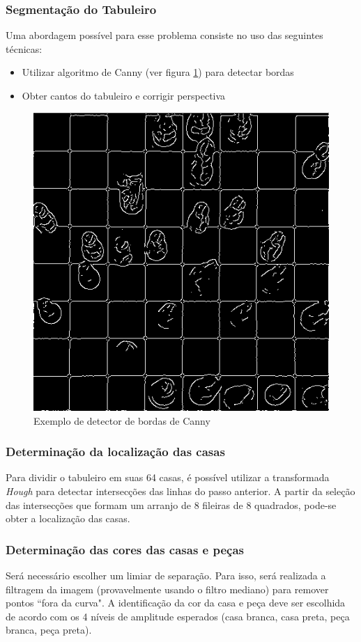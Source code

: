 \documentclass[a4paper,12pt,twoside]{article}
\begin{document}
\subsubsection{Segmentação do Tabuleiro}
Uma abordagem possível para esse problema consiste no uso das seguintes técnicas:
\begin{itemize}
    \item{Utilizar algoritmo de Canny (ver figura \ref{fig:detector}) para detectar bordas}
    \item{Obter cantos do tabuleiro e corrigir perspectiva}
\end{itemize}

\begin{figure}[h!]
\centering
  \includegraphics[width=0.6\linewidth]{fig/detector.png}
\caption{Exemplo de detector de bordas de Canny}
\label{fig:detector}
\end{figure}

\subsubsection{Determinação da localização das casas}
Para dividir o tabuleiro em suas 64 casas,
é possível utilizar a transformada \textit{Hough} para detectar intersecções das linhas do passo anterior.
A partir da seleção das intersecções que formam um arranjo de 8 fileiras de 8 quadrados,
pode-se obter a localização das casas.

\subsubsection{Determinação das cores das casas e peças}
Será necessário escolher um limiar de separação.
Para isso, será realizada a filtragem da imagem
(provavelmente usando o filtro mediano) para remover pontos ``fora da curva".
A identificação da cor da casa e peça deve ser escolhida 
de acordo com os 4 níveis de amplitude esperados 
(casa branca, casa preta, peça branca, peça preta).
\end{document}
